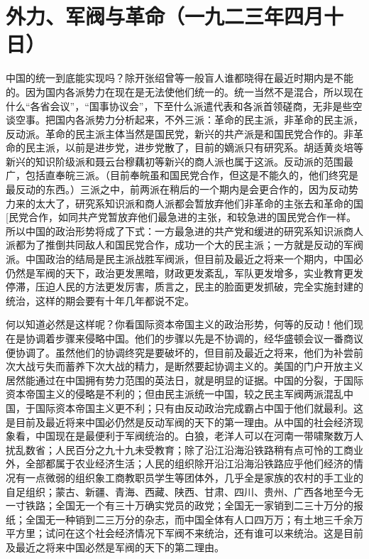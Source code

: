 \section{外力、军阀与革命（一九二三年四月十日）}


中国的统一到底能实现吗？除开张绍曾等一般盲人谁都晓得在最近时期内是不能的。因为国内各派势力在现在是无法使他们统一的。统一当然不是混合，所以现在什么“各省会议”，“国事协议会”，下至什么派遣代表和各派首领磋商，无非是些空谈空事。把国内各派势力分析起来，不外三派：革命的民主派，非革命的民主派，反动派。革命的民主派主体当然是国民党，新兴的共产派是和国民党合作的。非革命的民主派，以前是进步党，进步党散了，目前的嫡派只有研究系。胡适黄炎培等新兴的知识阶级派和聂云台穆藕初等新兴的商人派也属于这派。反动派的范围最广，包括直奉皖三派。（目前奉皖虽和国民党合作，但这是不能久的，他们终究是最反动的东西。）三派之中，前两派在稍后的一个期内是会更合作的，因为反动势力来的太大了，研究系知识派和商人派都会暂放弃他们非革命的主张去和革命的国[民党合作，如同共产党暂放弃他们最急进的主张，和较急进的国民党合作一样。所以中国的政治形势将成了下式：一方最急进的共产党和缓进的研究系知识派商人派都为了推倒共同敌人和国民党合作，成功一个大的民主派；一方就是反动的军阀派。中国政治的结局是民主派战胜军阀派，但目前及最近之将来一个期内，中国必仍然是军阀的天下，政治更发黑暗，财政更发紊乱，军队更发增多，实业教育更发停滞，压迫人民的方法更发厉害，质言之，民主的脸面更发抓破，完全实施封建的统治，这样的期会要有十年几年都说不定。

何以知道必然是这样呢？你看国际资本帝国主义的政治形势，何等的反动！他们现在是协调着步骤来侵略中国。他们的步骤以先是不协调的，经华盛顿会议一番商议便协调了。虽然他们的协调终究是要破坏的，但目前及最近之将来，他们为补尝前次大战亏失而蓄养下次大战的精力，是断然要起协调主义的。美国的门户开放主义居然能通过在中国拥有势力范围的英法日，就是明显的证据。中国的分裂，于国际资本帝国主义的侵略是不利的；但由民主派统一中国，较之民主军阀两派混乱中国，于国际资本帝国主义更不利；只有由反动政治完成霸占中国于他们就最利。这是目前及最近将来中国必仍然是反动军阀的天下的第一理由。从中国的社会经济现象看，中国现在是最便利于军阀统治的。白狼，老洋人可以在河南一带啸聚数万人扰乱数省；人民百分之九十九未受教育；除了沿江沿海沿铁路稍有点可怜的工商业外，全部都属于农业经济生活；人民的组织除开沿江沿海沿铁路应乎他们经济的情况有一点微弱的组织象工商教职员学生等团体外，几乎全是家族的农村的手工业的自足组织；蒙古、新疆、青海、西藏、陕西、甘肃、四川、贵州、广西各地至今无一寸铁路；全国无一个有三十万确实党员的政党；全国无一家销到二三十万分的报纸；全国无一种销到二三万分的杂志，而中国全体有人口四万万；有土地三千余万平方里；试问在这个社会经济情况下军阀不来统治，还有谁可以来统治。这是目前及最近之将来中国必然是军阀的天下的第二理由。

